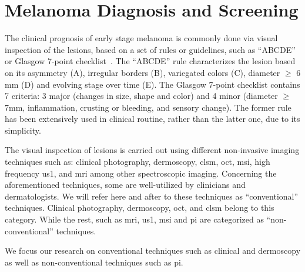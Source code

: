 \section{Melanoma Diagnosis and Screening}\label{sec:chp1sec4}
The clinical prognosis of early stage melanoma is commonly done via visual inspection of the lesions, based on a set of rules or guidelines, such as ``ABCDE''~\cite{abbasi2004early} or Glasgow 7-point checklist~\cite{abbasi2004early}.
The ``ABCDE'' rule characterizes the lesion based on its asymmetry (A), irregular borders (B), variegated colors (C), diameter $\geq$ 6  \si{\milli\meter} (D) and evolving stage over time (E).
The Glasgow 7-point checklist contains 7 criteria: 3 major (changes in size, shape and color) and 4 minor (diameter $\geq$ 7\si{\milli\meter}, inflammation, crusting or bleeding, and sensory change). 
The former rule has been extensively used in clinical routine, rather than the latter one, due to its simplicity.


The visual inspection of lesions is carried out using different non-invasive imaging techniques such as: clinical photography, dermoscopy, \acf{clsm}, \acf{oct}, \acf{msi}, high frequency \acf{us1}, and \acf{mri} among other spectroscopic imaging. 
Concerning the aforementioned techniques, some are well-utilized by clinicians and dermatologists. 
We will refer here and after to these techniques as ``conventional'' techniques.
Clinical photography, dermoscopy, \ac{oct}, and \ac{clsm} belong to this category. 
While the rest, such as \ac{mri}, \ac{us1}, \ac{msi} and \ac{pi} are categorized as ``non-conventional'' techniques.  

We focus our research on conventional techniques such as clinical and dermoscopy as well as non-conventional techniques such as \ac{pi}. 


